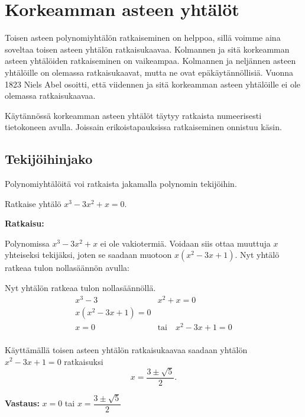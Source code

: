 \section{Korkeamman asteen yhtälöt}
Toisen asteen polynomiyhtälön ratkaiseminen on helppoa, sillä voimme aina soveltaa toisen asteen yhtälön ratkaisukaavaa.
Kolmannen ja sitä korkeamman asteen yhtälöiden ratkaiseminen on vaikeampaa.
Kolmannen ja neljännen asteen yhtälöille on olemassa ratkaisukaavat, mutta ne ovat epäkäytännöllisiä.
Vuonna 1823 Niels Abel osoitti, että viidennen ja sitä korkeamman asteen yhtälöille ei ole olemassa ratkaisukaavaa.

Käytännössä korkeamman asteen yhtälöt täytyy ratkaista numeerisesti tietokoneen avulla. Joissain erikoistapauksissa ratkaiseminen onnistuu käsin.


\subsection*{Tekijöihinjako}

Polynomiyhtälöitä voi ratkaista jakamalla polynomin tekijöihin.


\begin{esimerkki}
Ratkaise yhtälö $x^3 - 3x^2 + x = 0$.

\textbf{Ratkaisu:}

Polynomissa $x^3 - 3x^2 + x$ ei ole vakiotermiä. Voidaan siis ottaa muuttuja $x$ yhteiseksi tekijäksi, joten se saadaan muotoon $x(x^2 - 3x + 1)$. Nyt yhtälö ratkeaa tulon nollasäännön avulla:

Nyt yhtälön ratkeaa tulon nollasäännöllä.
\begin{align*}
x^3 - 3&x^2 + x=0 \\
x(x^2 - 3x + 1)=0 \\
x= 0 \quad &\text{tai} \quad x^2 - 3x + 1 = 0 \\
\end{align*}

Käyttämällä toisen asteen yhtälön ratkaisukaavaa saadaan yhtälön $x^2 - 3x + 1 = 0$ ratkaisuksi
\[x = \frac{3\pm \sqrt{5}}{2}.\]

\textbf{Vastaus:}
$x= 0$ tai $x=\dfrac{3\pm \sqrt{5}}{2}$
\end{esimerkki}

